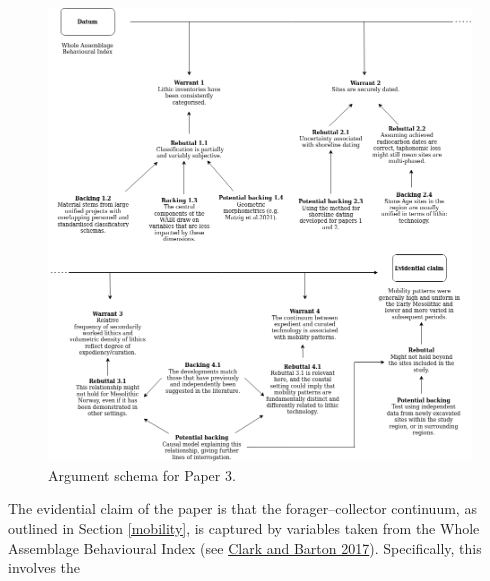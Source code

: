 \documentclass[
  12pt,
  a4paper,
  oneside]{book}
\begin{document}
\begin{figure}

{\centering \includegraphics[width=1.05\linewidth]{figures/toulmin_p3} 

}

\caption{Argument schema for Paper 3.}\label{fig:t3}
\end{figure}

The evidential claim of the paper is that the forager--collector continuum, as outlined in Section \ref{mobility}, is captured by variables taken from the Whole Assemblage Behavioural Index (see \protect\hyperlink{ref-clark2017}{Clark and Barton 2017}). Specifically, this involves the
\end{document}
